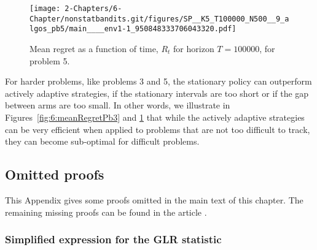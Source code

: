 \begin{figure}[h!]  %
    \centering
    \texttt{[image: 2-Chapters/6-Chapter/nonstatbandits.git/figures/SP\_\_K5\_T100000\_N500\_\_9\_algos\_pb5/main\_\_\_\_env1-1\_950848333706043320.pdf]}
    \caption{Mean regret as a function of time, $R_t$ for horizon $T = 100000$, for problem 5.}
    \label{fig:6:meanRegretPb5}
\end{figure}


For harder problems, like problems 3 and 5, the stationary policy \klUCB{} can outperform actively adaptive strategies, if the stationary intervals are too short or if the gap between arms are too small.
In other words, we illustrate in Figures~\ref{fig:6:meanRegretPb3} and \ref{fig:6:meanRegretPb5} that while the actively adaptive strategies can be very efficient when applied to problems that are not too difficult to track, they can become sub-optimal for difficult problems.


\subsection{Omitted proofs}\label{proof:6:Conc}

This Appendix gives some proofs omitted in the main text of this chapter.
The remaining missing proofs can be found in the article \cite{Besson2019GLRT}.


\subsubsection{Simplified expression for the GLR statistic}\label{app:6:GLR_with_kl}


